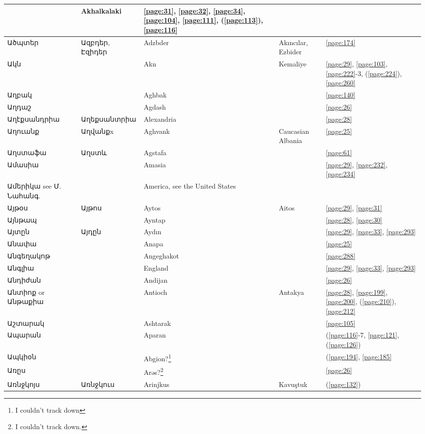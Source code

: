 \begin{center}
\begin{longtable}{|p{}|p{3cm}|p{3cm}|p{2cm}|p{3cm}|}
& {Akhalkalaki}&\ref{page:31}, \ref{page:32}, \ref{page:34}, \ref{page:104}, \ref{page:111}, (\ref{page:113}), \ref{page:116}\\ \hline
Ածպտեր& Ազբդեր, Էզիդեր& 
{Adzbder} &Akıncılar, Ezbider &\ref{page:174}\\ \hline
Ակն& &
{Akn}&Kemaliye &\ref{page:29}, \ref{page:103}, \ref{page:222}-3, (\ref{page:224}), \ref{page:260}\\ \hline
Աղբակ& & 
{Aghbak}& &\ref{page:140}\\ \hline
Աղդաշ& & 
{Agdash}& &\ref{page:26}\\ \hline
Աղէքսանդրիա& Աղեքսանտրիա
&{Alexandria}& &\ref{page:28}\\ \hline
Աղուանք& Աղվանքx
& {Aghvank}&Caucasian Albania &\ref{page:25}\\ \hline
Աղստաֆա& Աղստև
& {Agstafa}& &\ref{page:61}\\ \hline
Ամասիա& & 
{Amasia}& &\ref{page:29}, \ref{page:232}, \ref{page:234}\\ \hline
Ամերիկա see Մ. Նահանգ.& &America, see the United States & &\\ \hline
Այթօս&Այթոս & 
{Aytos}& Aitos&\ref{page:29}, \ref{page:31}\\ \hline
Այնթապ& &
Ayntap& &\ref{page:28}, \ref{page:30}\\ \hline
Այտըն& Այդըն 
&{Aydın} & &\ref{page:29}, \ref{page:33}, \ref{page:293}\\ \hline
Անափա & &Anapa & & \ref{page:25} \\\hline 
Անգեղակոթ &   &Angeghakot & & \ref{page:288} \\ \hline 
Անգլիա & &England & & \ref{page:29}, \ref{page:33}, \ref{page:293} \\ \hline 
Անդիժան& & 
{Andijan}& &\ref{page:26}\\ \hline
Անտիոք or Անթաքիա& & 
Antioch& Antakya &\ref{page:28}, \ref{page:199}, \ref{page:200}, (\ref{page:210}), \ref{page:212}\\ \hline
Աշտարակ& & 
{Ashtarak}& &\ref{page:105}\\ \hline
Ապարան& & 
{Aparan}& &(\ref{page:116}-7, \ref{page:121}, (\ref{page:126})\\ \hline
Ապկիօն& &
{Abgion?}\footnote{I couldn't track down}& &(\ref{page:194}, \ref{page:185}\\ \hline
Առըս& & 
{Arəs?}\footnote{I couldn't track down.}&&\ref{page:26}\\ \hline
Առնջկոյս&Առնջկուս
& Arinjkus& Kavuştuk       &(\ref{page:132})\\ \hline

\end{longtable}
\end{center}
